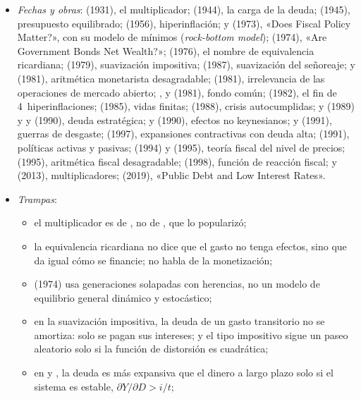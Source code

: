 \documentclass[11pt]{article}
\begin{document}
\begin{itemize}
\item \emph{Fechas y obras}:  (1931), el multiplicador;  (1944), la carga de la deuda;  (1945), presupuesto equilibrado;  (1956), hiperinflación;  y  (1973), «Does Fiscal Policy Matter?», con su modelo de mínimos (\emph{rock-bottom model});  (1974), «Are Government Bonds Net Wealth?»;  (1976), el nombre de equivalencia ricardiana;  (1979), suavización impositiva;  (1987), suavización del señoreaje;  y  (1981), aritmética monetarista desagradable;  (1981), irrelevancia de las operaciones de mercado abierto; ,  y  (1981), fondo común;  (1982), el fin de 4~hiperinflaciones;  (1985), vidas finitas;  (1988), crisis autocumplidas;  y  (1989) y  y  (1990), deuda estratégica;  y  (1990), efectos no keynesianos;  y  (1991), guerras de desgaste;  (1997), expansiones contractivas con deuda alta;  (1991), políticas activas y pasivas;  (1994) y  (1995), teoría fiscal del nivel de precios;  (1995), aritmética fiscal desagradable;  (1998), función de reacción fiscal;  y  (2013), multiplicadores;  (2019), «Public Debt and Low Interest Rates».
\item \emph{Trampas}:
  \begin{itemize}
  \item el multiplicador es de , no de , que lo popularizó;
  \item la equivalencia ricardiana no dice que el gasto no tenga efectos, sino que da igual cómo se financie; no habla de la monetización;
  \item {} (1974) usa generaciones solapadas con herencias, no un modelo de equilibrio general dinámico y estocástico;
  \item en la suavización impositiva, la deuda de un gasto transitorio no se amortiza: solo se pagan sus intereses; y el tipo impositivo sigue un paseo aleatorio solo si la función de distorsión es cuadrática;
  \item en  y , la deuda es más expansiva que el dinero a largo plazo solo si el sistema es estable, $\partial Y/\partial D>i/t$;

\end{itemize}
\end{itemize}
\end{document}
